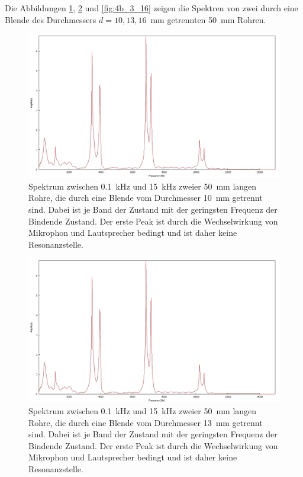 \noindent Die Abbildungen \ref{fig:4b_3_10}, \ref{fig:4b_3_13} und \ref{fig:4b_3_16}  zeigen die Spektren von zwei durch eine Blende des Durchmessers $d=10,13,16$~mm getrennten 50~mm Rohren.
\begin{figure}
\centering
\includegraphics[width=\textwidth]{content/messungen/Chapter4b/4b_3_10.jpg}
\caption{Spektrum zwischen 0.1~kHz und 15~kHz zweier 50~mm langen Rohre, die durch eine Blende vom Durchmesser 10~mm getrennt sind. Dabei ist je Band der Zustand mit der geringsten Frequenz der Bindende Zustand. Der erste Peak ist durch die Wechselwirkung von Mikrophon und Lautsprecher bedingt und ist daher keine Resonanzstelle.}
\label{fig:4b_3_10}
\end{figure}
\begin{figure}
\centering
\includegraphics[width=\textwidth]{content/messungen/Chapter4b/4b_3_10.jpg}
\caption{Spektrum zwischen 0.1~kHz und 15~kHz zweier 50~mm langen Rohre, die durch eine Blende vom Durchmesser 13~mm getrennt sind. Dabei ist je Band der Zustand mit der geringsten Frequenz der Bindende Zustand. Der erste Peak ist durch die Wechselwirkung von Mikrophon und Lautsprecher bedingt und ist daher keine Resonanzstelle.}
\label{fig:4b_3_13}
\end{figure}
